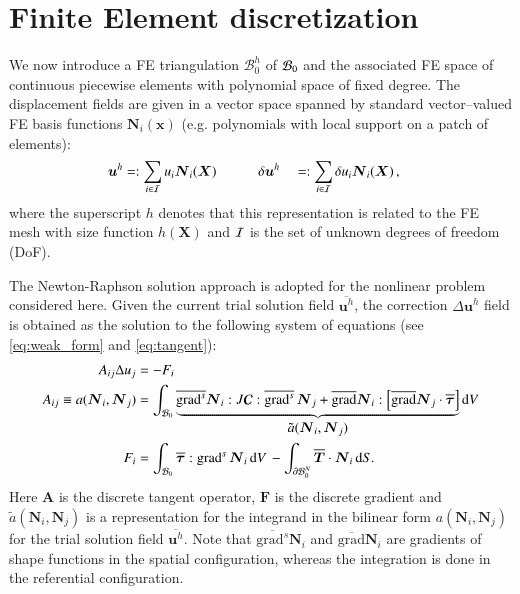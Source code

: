 \documentclass[preprint,12pt,times]{elsarticle}
\def\gz  #1{           \mbox{$\boldsymbol{#1}$}}
\def\grad {\mbox{grad}}
\def\d {\mbox{d}}
\def\mcl  #1{               {\cal #1}}
\begin{document}
\section{Finite Element discretization}
\label{sec:fe}

We now introduce a FE triangulation $\mathcal{B}^h_0$ of $\mcl B_0$ and
the associated FE space of continuous piecewise elements with polynomial space of fixed degree. %
The displacement fields are given in
a vector space spanned by standard vector--valued FE basis functions $\gz N_i(\gz x)$ (e.g. polynomials with local support on a patch of elements):
\begin{alignat}{2}
       \gz u^h &=:  \sum_{i \in \mcl I} u_i \gz N_i (\gz X) \quad \quad \quad
\delta \gz u^h &&=: \sum_{i \in \mcl I} \delta u_i \gz N_i (\gz X) \,,
\end{alignat}
where the superscript $h$ denotes that this representation is related to the FE mesh with size function $h(\gz X)$ and $\mcl I$ is the set of unknown degrees of freedom (DoF).

The Newton-Raphson solution approach is adopted for the nonlinear problem considered here.
Given the current trial solution field $\overline{\gz u^h}$, the correction $\Delta \gz u^h$ field is obtained as the solution to the following system of equations (see \eqref{eq:weak_form} and \eqref{eq:tangent}):
\begin{align}
  A_{ij} \Delta u_j &= - F_i  \label{eq:linear_system} \\
  A_{ij} \equiv a(\gz N_i, \gz N_j) &=
  \int_{\mcl B_0}
  \underbrace{
  \overline{\grad^s} \gz N_i : J \boldsymbol{\mathcal{C}} : \overline{\grad^s} \, \gz N_j
  +
  \overline{\grad}\gz N_i :
  \left[
  \overline{\grad} \gz N_j \cdot
  \overline{\gz \tau}
  \right]
  }_{\displaystyle \tilde{a}(\gz N_i, \gz N_j)}
  \d V
  \label{eq:algebraic_tangent}
  \\
  F_i &=
  \int_{\mcl B_0} \overline{\gz \tau} : \grad^{s} \, \gz N_i \, \d V \,
  -
  \int_{\partial \mcl B_0^N} \overline{\gz T} \cdot \gz N_i \, \d S.
\end{align}
Here $\gz A$ is the discrete tangent {\color{red}operator}, $\gz F$ is the discrete gradient
and $\tilde{a}(\gz N_i, \gz N_j)$ is a representation for the integrand in the bilinear form $a(\gz N_i, \gz N_j)$ for the trial solution field $\overline{\gz u^h}$.
Note that $\overline{\grad^s} \gz N_i$ and $\overline{\grad} \gz N_i$ are gradients of shape functions in the {\color{red}spatial} configuration, whereas the integration is done in the {\color{red}referential} configuration.
\end{document}
